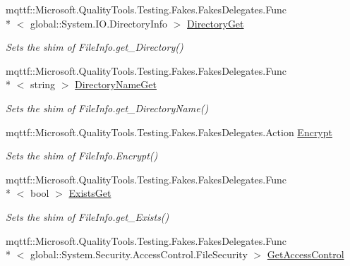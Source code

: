\begin{DoxyCompactItemize}
mqttf\-::\-Microsoft.\-Quality\-Tools.\-Testing.\-Fakes.\-Fakes\-Delegates.\-Func\\*
$<$ global\-::\-System.\-I\-O.\-Directory\-Info $>$ \hyperlink{class_system_1_1_i_o_1_1_fakes_1_1_shim_file_info_a2127bb8cd7ac6b6ef28c531ba4391374}{Directory\-Get}
\begin{DoxyCompactList}\small\item\em Sets the shim of File\-Info.\-get\-\_\-\-Directory()\end{DoxyCompactList}\item 
mqttf\-::\-Microsoft.\-Quality\-Tools.\-Testing.\-Fakes.\-Fakes\-Delegates.\-Func\\*
$<$ string $>$ \hyperlink{class_system_1_1_i_o_1_1_fakes_1_1_shim_file_info_ad1ac2244fd6b0522af459d902db2572e}{Directory\-Name\-Get}
\begin{DoxyCompactList}\small\item\em Sets the shim of File\-Info.\-get\-\_\-\-Directory\-Name()\end{DoxyCompactList}\item 
mqttf\-::\-Microsoft.\-Quality\-Tools.\-Testing.\-Fakes.\-Fakes\-Delegates.\-Action \hyperlink{class_system_1_1_i_o_1_1_fakes_1_1_shim_file_info_a4a4410662b11deb0f511fcb9f18ad2dd}{Encrypt}
\begin{DoxyCompactList}\small\item\em Sets the shim of File\-Info.\-Encrypt()\end{DoxyCompactList}\item 
mqttf\-::\-Microsoft.\-Quality\-Tools.\-Testing.\-Fakes.\-Fakes\-Delegates.\-Func\\*
$<$ bool $>$ \hyperlink{class_system_1_1_i_o_1_1_fakes_1_1_shim_file_info_a7e95e7da3307bc8fbc147deadbb5a86d}{Exists\-Get}
\begin{DoxyCompactList}\small\item\em Sets the shim of File\-Info.\-get\-\_\-\-Exists()\end{DoxyCompactList}\item 
mqttf\-::\-Microsoft.\-Quality\-Tools.\-Testing.\-Fakes.\-Fakes\-Delegates.\-Func\\*
$<$ global\-::\-System.\-Security.\-Access\-Control.\-File\-Security $>$ \hyperlink{class_system_1_1_i_o_1_1_fakes_1_1_shim_file_info_ae197bc603910a10c15e44cd8bfdf12be}{Get\-Access\-Control}

\end{DoxyCompactItemize}
